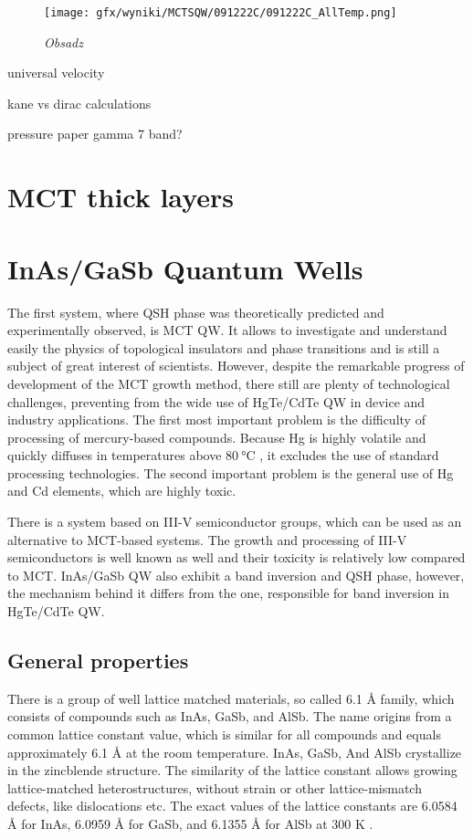 \documentclass[titlepage,a4paper]{book}
\newcommand{\wciecie}{\quad\phantom{v}}
\begin{document}
\begin{figure}[ht]
	\centering
	\texttt{[image: gfx/wyniki/MCTSQW/091222C/091222C\_AllTemp.png]}
	\vspace{-10pt}
	\caption{\textit{Obsadz}}
	\label{fig:091222C_AllTemp}
\end{figure}

universal velocity

kane vs dirac calculations

pressure paper gamma 7 band?

\chapter{MCT thick layers}
\label{chpt:MCT_TL}
\wciecie


\chapter{InAs/GaSb Quantum Wells}
\wciecie
The first system, where QSH phase was theoretically predicted and experimentally observed, is MCT QW. It allows to investigate and understand easily the physics of topological insulators and phase transitions and is still a subject of great interest of scientists. However, despite the remarkable progress of development of the MCT growth method, there still are plenty of technological challenges, preventing from the wide use of HgTe/CdTe QW in device and industry applications. The first most important problem is the difficulty of processing of mercury-based compounds. Because Hg is highly volatile and quickly diffuses in temperatures above $\SI{80}{\degreeCelsius}$ \cite{Daumer_MCT_temperature}, it excludes the use of standard processing technologies. The second important problem is the general use of Hg and Cd elements, which are highly toxic.

There is a system based on III-V semiconductor groups, which can be used as an alternative to MCT-based systems. The growth and processing of III-V semiconductors is well known as well and their toxicity is relatively low compared to MCT. InAs/GaSb QW also exhibit a band inversion and QSH phase, however, the mechanism behind it differs from the one, responsible for band inversion in HgTe/CdTe QW.

\section{General properties}
There is a group of well lattice matched materials, so called 6.1 Å family, which consists of compounds such as InAs, GaSb, and AlSb. The name origins from a common lattice constant value, which is similar for all compounds and equals approximately 6.1 Å at the room temperature. InAs, GaSb, And AlSb crystallize in the zincblende structure. The similarity of the lattice constant allows growing lattice-matched heterostructures, without strain or other lattice-mismatch defects, like dislocations etc. The exact values of the lattice constants are 6.0584 Å for InAs, 6.0959 Å for GaSb, and 6.1355 Å for AlSb at 300 K \cite{Sze}.
\end{document}
